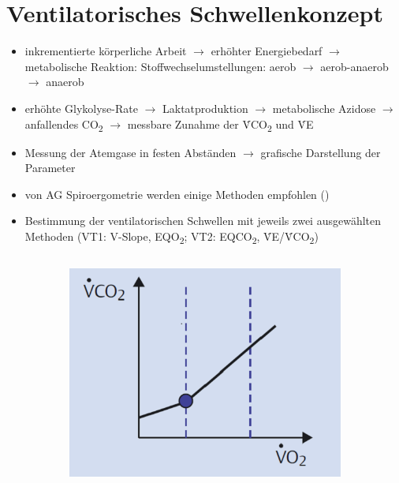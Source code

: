 \documentclass[colorBG,slideColor,8pt]{beamer}
\newcommand{\eqotwo}{EQO\textsubscript{2}}
\newcommand{\eqcotwo}{EQCO\textsubscript{2}}
\newcommand{\vcotwo}{\.{V}CO\textsubscript{2}}
\newcommand{\ve}{\.{V}E}
\begin{document}

\section{Ventilatorisches Schwellenkonzept}

\begin{frame}
\begin{itemize}
	\item inkrementierte körperliche Arbeit $\rightarrow$ erhöhter Energiebedarf $\rightarrow$ metabolische Reaktion: Stoffwechselumstellungen: aerob $\rightarrow$ aerob-anaerob $\rightarrow$ anaerob
	\item erhöhte Glykolyse-Rate $\rightarrow$ Laktatproduktion $\rightarrow$ metabolische Azidose $\rightarrow$ anfallendes CO\textsubscript{2} $\rightarrow$ messbare Zunahme der \vcotwo{} und \ve
	\item Messung der Atemgase in festen Abständen $\rightarrow$ grafische Darstellung der Parameter
	\item von AG Spiroergometrie werden einige Methoden empfohlen (\cite{Westhoff.2012})
	\item Bestimmung der ventilatorischen Schwellen mit jeweils zwei ausgewählten Methoden (VT1: V-Slope, \eqotwo; VT2: \eqcotwo, \ve/\vcotwo)
\end{itemize}
\begin{columns}
\begin{column}{\linewidth}
\begin{figure}[H]
	\begin{subfigure}[c]{0.2\linewidth}
		\centering
		\includegraphics[width=0.8\linewidth]{Bilder/vslope.png}

\end{subfigure}
\end{figure}
\end{column}
\end{columns}
\end{frame}
\end{document}
